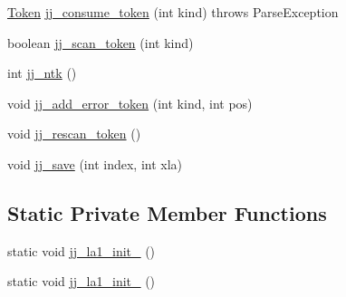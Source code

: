\begin{DoxyCompactItemize}
\hyperlink{classorg_1_1coode_1_1owl_1_1krssparser_1_1_token}{Token} \hyperlink{classorg_1_1coode_1_1owl_1_1krssparser_1_1_k_r_s_s_parser_a3ffc7a54b187feea2f6d3261e5220130}{jj\-\_\-consume\-\_\-token} (int kind)  throws Parse\-Exception 
\item 
boolean \hyperlink{classorg_1_1coode_1_1owl_1_1krssparser_1_1_k_r_s_s_parser_ae1a41dfd11ed2d094b17c685ac29473b}{jj\-\_\-scan\-\_\-token} (int kind)
\item 
int \hyperlink{classorg_1_1coode_1_1owl_1_1krssparser_1_1_k_r_s_s_parser_ab38cd1a65ad09a7274d0474f288e9cb4}{jj\-\_\-ntk} ()
\item 
void \hyperlink{classorg_1_1coode_1_1owl_1_1krssparser_1_1_k_r_s_s_parser_a16e6bca5d66f55380140b7a2f27a32bb}{jj\-\_\-add\-\_\-error\-\_\-token} (int kind, int pos)
\item 
void \hyperlink{classorg_1_1coode_1_1owl_1_1krssparser_1_1_k_r_s_s_parser_a48e6bea442894e67e50e4ae242300527}{jj\-\_\-rescan\-\_\-token} ()
\item 
void \hyperlink{classorg_1_1coode_1_1owl_1_1krssparser_1_1_k_r_s_s_parser_a42e98e23f624d55cbf82e834d57edd08}{jj\-\_\-save} (int index, int xla)
\end{DoxyCompactItemize}
\subsection*{Static Private Member Functions}
\begin{DoxyCompactItemize}
\item 
static void \hyperlink{classorg_1_1coode_1_1owl_1_1krssparser_1_1_k_r_s_s_parser_a1bbff3ea34186f4599df61ad43080834}{jj\-\_\-la1\-\_\-init\-\_} ()
\item 
static void \hyperlink{classorg_1_1coode_1_1owl_1_1krssparser_1_1_k_r_s_s_parser_a477bfb20a05d371842e79102c1dd5130}{jj\-\_\-la1\-\_\-init\-\_} ()
\end{DoxyCompactItemize}
